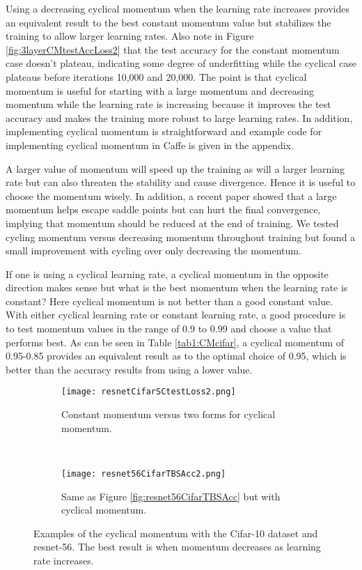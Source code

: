 \documentclass{article} %
\begin{document}
Using a decreasing cyclical momentum when the learning rate increases provides an equivalent result to the best constant momentum value but stabilizes the training to allow larger learning rates.  Also note in Figure \ref{fig:3layerCMtestAccLoss2} that the test accuracy for the constant momentum case doesn't plateau, indicating some degree of underfitting while the cyclical case plateaus before iterations 10,000 and 20,000.  The point is that cyclical momentum is useful for starting with a large momentum and decreasing momentum while the learning rate is increasing because it improves the test accuracy and makes the training more robust to large learning rates.  In addition, implementing cyclical momentum is straightforward and example code for implementing cyclical momentum in Caffe is given in the appendix.

A larger value of momentum will speed up the training as will a larger learning rate but can also threaten the stability and cause divergence.  Hence it is useful to choose the momentum wisely.  In addition, a recent paper \citep{liu2018toward} showed that a large momentum helps escape saddle points but can hurt the final convergence, implying that momentum should be reduced at the end of training.  We tested cycling momentum versus decreasing momentum throughout training but found a small improvement with cycling over only decreasing the momentum.

If one is using a cyclical learning rate, a cyclical momentum in the opposite direction makes sense but what is the best momentum when the learning rate is constant? Here cyclical momentum is not better than a good constant value. With either cyclical learning rate or constant learning rate, a good procedure is to test momentum values in the range of 0.9 to 0.99  and choose a value that performs best.  As can be seen in Table \ref{tab1:CMcifar}, a cyclical momentum of 0.95-0.85 provides an equivalent result as to the optimal choice of 0.95, which is better than the accuracy results from using a lower value.  

\begin{figure}[tbh]
	\centering
	\centering
	\begin{subfigure}[b]{0.43\textwidth}
		\texttt{[image: resnetCifarSCtestLoss2.png]}
		\caption{Constant momentum versus two forms for cyclical momentum.}
		\label{fig:resnetCifarSCtestLoss2}       %
	\end{subfigure}
	\quad
	\hfill
	~ %
	\begin{subfigure}[b]{0.5\textwidth}
		\texttt{[image: resnet56CifarTBSAcc2.png]}
		\caption{Same as Figure \ref{fig:resnet56CifarTBSAcc} but with cyclical momentum. }
		\label{fig:resnet56CifarTBSAcc2}       %
	\end{subfigure}
	\caption{Examples of the cyclical momentum with the Cifar-10 dataset and resnet-56.  The best result is when momentum decreases as learning rate increases. }
	\label{fig:resnetCifarCM}
	\vspace{-5pt}	
\end{figure}
\end{document}
